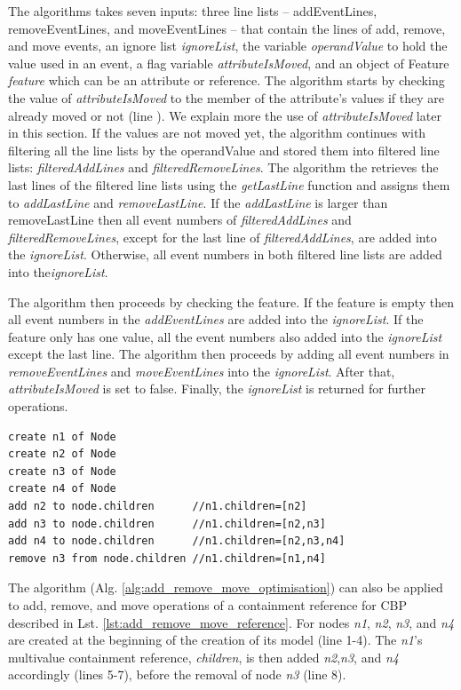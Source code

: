 \documentclass{llncs}
\begin{document}
The algorithms takes seven inputs: three line lists -- addEventLines, removeEventLines, and moveEventLines -- that contain the lines of add, remove, and move events, an ignore list \emph{ignoreList}, the variable \emph{operandValue} to hold the value used in an event, a flag variable \emph{attributeIsMoved}, and an object of Feature \emph{feature} which can be an attribute or reference. The algorithm starts by checking the value of \emph{attributeIsMoved} to the member of the attribute's values if they are already moved or not (line ). We explain more the use of \emph{attributeIsMoved} later in this section. If the values are not moved yet, the algorithm continues with filtering all the line lists by the operandValue and stored them into filtered line lists: \emph{filteredAddLines} and \emph{filteredRemoveLines}. The algorithm the retrieves the last lines of the filtered line lists using the \emph{getLastLine} function and assigns them to \emph{addLastLine} and \emph{removeLastLine}. If the \emph{addLastLine} is larger than {removeLastLine} then all event numbers of \emph{filteredAddLines} and \emph{filteredRemoveLines}, except for the last line of \emph{filteredAddLines}, are added into the \emph{ignoreList}. Otherwise, all event numbers in both filtered line lists are added into the\emph{ignoreList}.

The algorithm then proceeds by checking the feature. If the feature is empty then all event numbers in the \emph{addEventLines} are added into the \emph{ignoreList}. If the feature only has one value, all the event numbers also added into the \emph{ignoreList} except the last line. The algorithm then proceeds by adding all event numbers in \emph{removeEventLines} and \emph{moveEventLines} into the \emph{ignoreList}. After that, \emph{attributeIsMoved} is set to false. Finally, the \emph{ignoreList} is returned for further operations.     

\begin{lstlisting}[style=eol,caption={Example of CBP representation of attribute \emph{values}'s add and remove operations.},label=lst:add_remove_move_reference]
create n1 of Node
create n2 of Node
create n3 of Node
create n4 of Node
add n2 to node.children      //n1.children=[n2] 
add n3 to node.children      //n1.children=[n2,n3] 
add n4 to node.children      //n1.children=[n2,n3,n4] 
remove n3 from node.children //n1.children=[n1,n4] 
\end{lstlisting}

The algorithm (Alg. \ref{alg:add_remove_move_optimisation}) can also be applied to add, remove, and move operations of a containment reference for CBP described in Lst. \ref{lst:add_remove_move_reference}. For nodes \emph{n1}, \emph{n2}, \emph{n3}, and \emph{n4} are created at the beginning of the creation of its model (line 1-4). The \emph{n1}'s multivalue containment reference, \emph{children}, is then added \emph{n2},\emph{n3}, and \emph{n4} accordingly (lines 5-7), before the removal of node \emph{n3} (line 8). 
\end{document}
